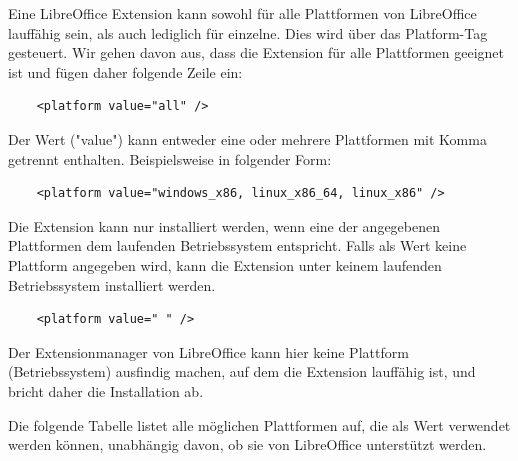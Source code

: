 \documentclass[12pt,a4paper,titlepage]{book}
\begin{document}
Eine LibreOffice Extension kann sowohl für alle Plattformen von LibreOffice lauffähig sein, als auch lediglich für einzelne. Dies wird über das Platform-Tag gesteuert. Wir gehen davon aus, dass die Extension für alle Plattformen geeignet ist und fügen daher folgende Zeile ein:
\begin{lstlisting}
	<platform value="all" />
\end{lstlisting}
Der Wert ("value") kann entweder eine oder mehrere Plattformen mit Komma getrennt enthalten. Beispielsweise in folgender Form:
\begin{lstlisting}
	<platform value="windows_x86, linux_x86_64, linux_x86" /> 
\end{lstlisting} 
Die Extension kann nur installiert werden, wenn eine der angegebenen Plattformen dem laufenden Betriebssystem entspricht. Falls als Wert keine Plattform angegeben wird, kann die Extension unter keinem laufenden Betriebssystem installiert werden.
\begin{lstlisting}
	<platform value=" " />
\end{lstlisting}
Der Extensionmanager von LibreOffice kann hier keine Plattform (Betriebssystem) ausfindig machen, auf dem die Extension lauffähig ist, und bricht daher die Installation ab.

Die folgende Tabelle listet alle möglichen Plattformen auf, die als Wert verwendet werden können, unabhängig davon, ob sie von LibreOffice unterstützt werden.\linebreak
\end{document}
